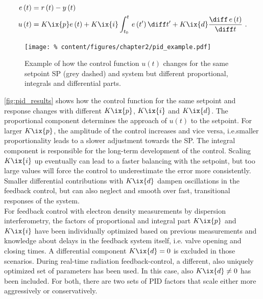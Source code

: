 %
                \begin{align}%
                    \begin{split}%
                        e\left(t\right)&=r\left(t\right)-y\left(t\right)\\%
                        u\left(t\right)&=K\ix{p}e\left(t\right)+K\ix{i}\int_{t_{0}}^{t}\,e\left(t^{\prime}\right)\diff t^{\prime}+K\ix{d}\frac{\diff\,e\left(t\right)}{\diff t}\,\,.%
                    \end{split}\label{eq:pid}%
                \end{align}%
%
                \begin{figure}[t]%
                    \centering%
                    \texttt{[image: \%
                        content/figures/chapter2/pid\_example.pdf]}%
                    \caption{Example of how the control function $u\left(t\right)$ changes for the same setpoint SP (grey dashed) and system but different proportional, integrals and differential parts.}\label{fig:pid_results}%
                \end{figure}%
%
                \autoref{fig:pid_results} shows how the control function for the same setpoint and response changes with different $K\ix{p}$, $K\ix{i}$ and $K\ix{d}$. The proportional component determines the approach of $u\left(t\right)$ to the setpoint. For larger $K\ix{p}$, the amplitude of the control increases and vice versa, i.e.smaller proportionality leads to a slower adjustment towards the SP. The integral component is responsible for the long-term development of the control. Scaling $K\ix{i}$ up eventually can lead to a faster balancing with the setpoint, but too large values will force the control to underestimate the error more consistently. Smaller differential contributions with $K\ix{d}$ dampen oscillations in the feedback control, but can also neglect and smooth over fast, transitional responses of the system.\\%
                For feedback control with electron density measurements by dispersion interferometry, the factors of proportional and integral part $K\ix{p}$ and $K\ix{i}$ have been individually optimized based on previous measurements and knowledge about delays in the feedback system itself, i.e. valve opening and closing times. A differential component $K\ix{d}=0$ is excluded in those scenarios. During real-time radiation feedback-control, a different, also uniquely optimized set of parameters has been used. In this case, also $K\ix{d}\neq 0$ has been included. For both, there are two sets of PID factors that scale either more aggressively or conservatively.%
%
